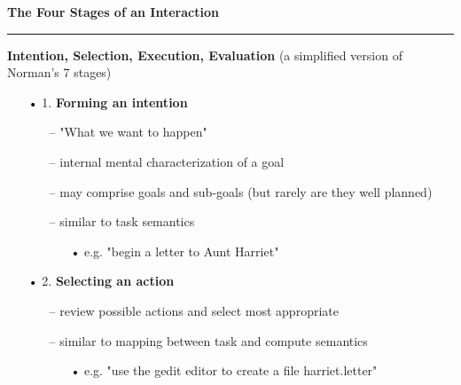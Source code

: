 \documentclass[pdf]{beamer}
\begin{document}
\begin{frame}
\vspace{8mm}
\textcolor{myBlue}{\textbf{\Large{The Four Stages of an Interaction}}}

\textcolor{red}{\rule{10cm}{1mm}}

\begin{small}

\textbf{Intention, Selection, Execution, Evaluation} (a simplified version of Norman’s 7 stages)

\begin{itemize}
\item [\textcolor{black}{•}]1. \textbf{Forming an intention}
      \begin{itemize}
      \item [\textcolor{black}{--}] "What we want to happen"
      \item [\textcolor{black}{--}]internal mental characterization of a goal
      \item [\textcolor{black}{--}]may comprise goals and sub-goals (but rarely are they well planned)
      \item [\textcolor{black}{--}]similar to task semantics
            \begin{itemize}
            \item [\textcolor{black}{•}]e.g. "begin a letter to Aunt Harriet"
            \end{itemize}
      \end{itemize}
      
\item [\textcolor{black}{•}]2. \textbf{Selecting an action}
      \begin{itemize}
      \item [\textcolor{black}{--}]review possible actions and select most appropriate
      \item [\textcolor{black}{--}]similar to mapping between task and compute semantics
            \begin{itemize}
            \item [\textcolor{black}{•}]e.g. "use the gedit editor to create a file harriet.letter"
            \end{itemize}
       \end{itemize}
\end{itemize}

\end{small}
\end{frame}
\end{document}
